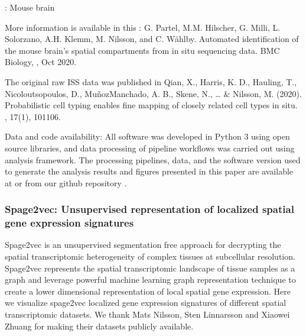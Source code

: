 \documentclass[letterpaper,10pt,english,openany,oneside]{sphinxmanual}
\begin{document}
\sphinxAtStartPar
{}

\sphinxAtStartPar
{}:
Mouse brain

\sphinxAtStartPar
More information is available in this : G. Partel, M.M. Hilscher, G. Milli, L. Solorzano, A.H. Klemm, M. Nilsson, and C. Wählby.  Automated identification of the mouse brain’s spatial compartments from in situ sequencing data.  BMC Biology, , Oct 2020.

\sphinxAtStartPar
The original raw ISS data was published in Qian, X., Harris, K. D., Hauling, T., Nicoloutsopoulos, D., Muñoz\sphinxhyphen{}Manchado, A. B., Skene, N., … \& Nilsson, M. (2020). Probabilistic cell typing enables fine mapping of closely related cell types in situ. , 17(1), 101\sphinxhyphen{}106.

\sphinxAtStartPar
Data and code availability: All software was developed in Python 3 using open source libraries, and data processing of pipeline workflows was carried out using  analysis framework. The processing pipelines, data, and the software version used to generate the analysis results and figures presented in this paper are available at  or from our github repository .


\subsubsection{Spage2vec: Unsupervised representation of localized spatial gene expression signatures}
\label{\detokenize{docs/starting/projects:spage2vec-unsupervised-representation-of-localized-spatial-gene-expression-signatures}}
\sphinxAtStartPar
Spage2vec is an unsupervised segmentation free approach for decrypting the spatial transcriptomic heterogeneity of complex tissues at subcellular resolution. Spage2vec represents the spatial transcriptomic landscape of tissue samples as a graph and leverage powerful machine learning graph representation technique to create a lower dimensional representation of local spatial gene expression. Here we visualize spage2vec localized gene expression signatures of different spatial transcriptomic datasets. We thank Mats Nilsson, Sten Linnarsson and Xiaowei Zhuang for making their datasets publicly available.
\end{document}
